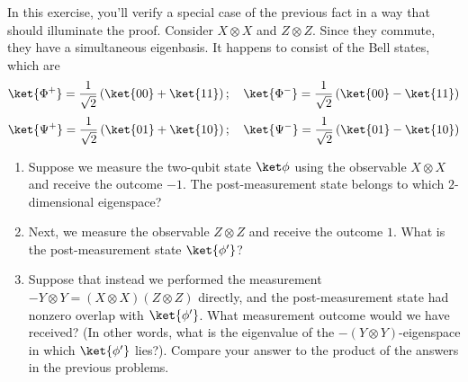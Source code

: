 \begin{exercises}
In this exercise, you'll verify a special case of the previous fact in a way that should illuminate the proof. Consider $X\otimes X$ and $Z\otimes Z$. Since they commute, they have a simultaneous eigenbasis. It happens to consist of the Bell states, which are
\[
	\ket{\Phi^+} = \frac1{\sqrt2}\left(\ket{00} + \ket{11}\right)
	; \quad \ket{\Phi^-} = \frac1{\sqrt2}\left(\ket{00} - \ket{11}\right)
\]
\[
	\ket{\Psi^+} = \frac1{\sqrt2}\left(\ket{01} + \ket{10}\right)
	; \quad \ket{\Psi^-} = \frac1{\sqrt2}\left(\ket{01} - \ket{10}\right)
\]
\begin{enumerate}
\item Suppose we measure the two-qubit state $\ket\phi$ using the observable $X\otimes X$ and receive the outcome $-1$. The post-measurement state belongs to which $2$-dimensional eigenspace?
\item Next, we measure the observable $Z\otimes Z$ and receive the outcome $1$. What is the post-measurement state $\ket{\phi'}$?
\item Suppose that instead we performed the measurement \mbox{$-Y\otimes Y = (X\otimes X)(Z\otimes Z)$} directly, and the post-measurement state had nonzero overlap with $\ket{\phi'}$. What measurement outcome would we have received? (In other words, what is the eigenvalue of the $-(Y\otimes Y)$-eigenspace in which $\ket{\phi'}$ lies?). Compare your answer to the product of the answers in the previous problems.
\end{enumerate}


\end{exercises}
